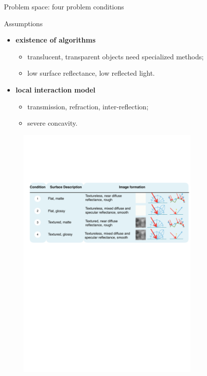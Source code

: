 \documentclass[10pt]{beamer}
\begin{document}
\begin{frame}{Problem space: four problem conditions}

\begin{exampleblock}{Assumptions}

\begin{itemize}
\item \textbf{existence of algorithms}
  \begin{itemize}
  \item translucent, transparent objects need specialized methods;
  \item low surface reflectance, low reflected light.
  \end{itemize}
\item \textbf{local interaction model}
  \begin{itemize}
  \item transmission, refraction, inter-reflection;
  \item severe concavity.
  \end{itemize}
\end{itemize}

\end{exampleblock}

\begin{figure}[h]
\includegraphics[width=0.8\textwidth]{prob_space/prob_cond}
\end{figure}

\end{frame}
\end{document}
